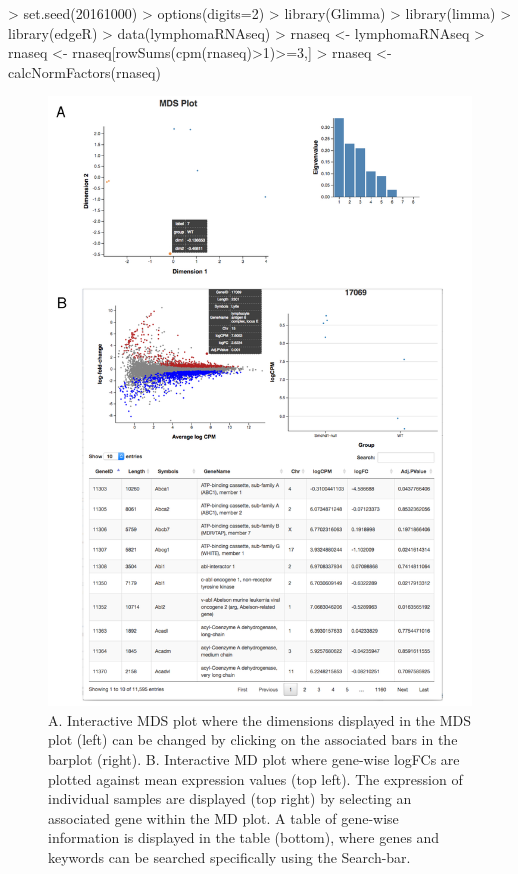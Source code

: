 \documentclass{article}
\begin{document}
\begin{Schunk}
\begin{Sinput}
> set.seed(20161000)
> options(digits=2)
> library(Glimma)
> library(limma)
> library(edgeR)
> data(lymphomaRNAseq)
> rnaseq <- lymphomaRNAseq
> rnaseq <- rnaseq[rowSums(cpm(rnaseq)>1)>=3,]
> rnaseq <- calcNormFactors(rnaseq)
\end{Sinput}
\end{Schunk}

\begin{figure}[!ht]
  \centerline{\includegraphics[width=0.7\linewidth]{quickstart.pdf}}
  \caption{A. Interactive MDS plot where the dimensions displayed in the MDS plot (left) can be changed by clicking on the associated bars in the barplot (right). B. Interactive MD plot where gene-wise logFCs are plotted against mean expression values (top left). The expression of individual samples are displayed (top right) by selecting an associated gene within the MD plot. A table of gene-wise information is displayed in the table (bottom), where genes and keywords can be searched specifically using the Search-bar.}
  \label{fig:quickstart}
\end{figure}
\end{document}
